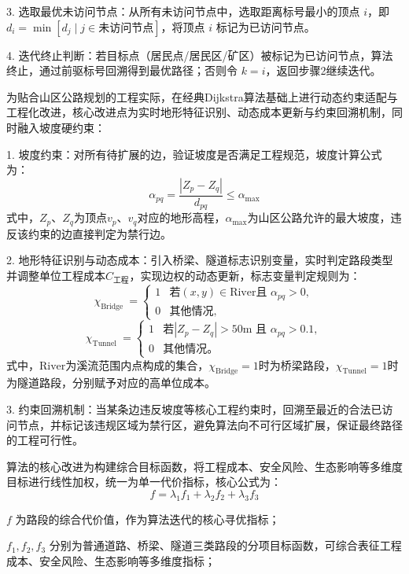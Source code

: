\documentclass{article}
\begin{document}
	3. 选取最优未访问节点：从所有未访问节点中，选取距离标号最小的顶点 \(i\)，即 \(d_i = \min\left[d_j \mid j \in \text{未访问节点}\right]\)，将顶点 \(i\) 标记为已访问节点。
	
	4. 迭代终止判断：若目标点（居民点/居民区/矿区）被标记为已访问节点，算法终止，通过前驱标号回溯得到最优路径；否则令 \(k=i\)，返回步骤2继续迭代。
	
	\newpage
	
	为贴合山区公路规划的工程实际，在经典Dijkstra算法基础上进行动态约束适配与工程化改进，核心改进点为实时地形特征识别、动态成本更新与约束回溯机制，同时融入坡度硬约束：
	
	1. 坡度约束：对所有待扩展的边，验证坡度是否满足工程规范，坡度计算公式为：
	$$
	\alpha_{p q}=\frac{\left|Z_{p}-Z_{q}\right|}{d_{p q}} \leq \alpha_{\text{max}}
	$$
	式中，$Z_p$、$Z_q$为顶点$v_p$、$v_q$对应的地形高程，$\alpha_{\text{max}}$为山区公路允许的最大坡度，违反该约束的边直接判定为禁行边。
	
	2. 地形特征识别与动态成本：引入桥梁、隧道标志识别变量，实时判定路段类型并调整单位工程成本$C_{\text{工程}}$，实现边权的动态更新，标志变量判定规则为：
	$$
	\chi_{\text{Bridge }}=\left\{\begin{array}{rr}1 & 若(x, y) \in \text{River且 } \alpha_{p q}>0, \\ 0 & 其他情况, \end{array}\right.
	$$
	$$
	\chi_{\text{Tunnel }}=\left\{\begin{array}{lr}1 & 若 \left|Z_{p}-Z_{q}\right|>50 \text{m 且 } \alpha_{p q}>0.1, \\ 0 & 其他情况。 \end{array}\right.
	$$
	式中，$\text{River}$为溪流范围内点构成的集合，$\chi_{\text{Bridge}}=1$时为桥梁路段，$\chi_{\text{Tunnel}}=1$时为隧道路段，分别赋予对应的高单位成本。
	
	3. 约束回溯机制：当某条边违反坡度等核心工程约束时，回溯至最近的合法已访问节点，并标记该违规区域为禁行区，避免算法向不可行区域扩展，保证最终路径的工程可行性。
	
	\newpage
	
	算法的核心改进为构建综合目标函数，将工程成本、安全风险、生态影响等多维度目标进行线性加权，统一为单一代价指标，核心公式为：
	$$
	f = \lambda_1 f_1 + \lambda_2 f_2 + \lambda_3 f_3
	$$
	
	$f$ 为路段的综合代价值，作为算法迭代的核心寻优指标；
	
	$f_1,f_2,f_3$ 分别为普通道路、桥梁、隧道三类路段的分项目标函数，可综合表征工程成本、安全风险、生态影响等多维度指标；
	
\end{document}
